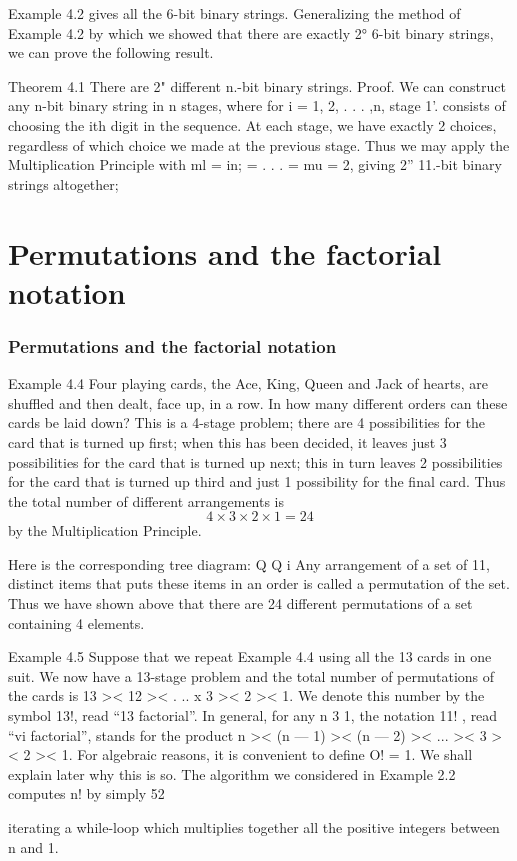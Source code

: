 \documentclass{beamer}
\begin{document}
\begin{frame}
Example 4.2 gives all the 6-bit binary strings. Generalizing the
method of Example 4.2 by which we showed that there are exactly
2° 6-bit binary strings, we can prove the following result.
\end{frame}
\begin{frame}
Theorem 4.1 There are 2" different n.-bit binary strings.
Proof. We can construct any n-bit binary string in n stages, where for
i = 1, 2, . . . ,n, stage 1'. consists of choosing the ith digit in the
sequence. At each stage, we have exactly 2 choices, regardless of
which choice we made at the previous stage. Thus we may apply the
Multiplication Principle with ml = in; = . . . = mu = 2, giving 2”
11.-bit binary strings altogether;
\end{frame}
\section{Permutations and the factorial notation}
\begin{frame}
\frametitle{Permutations and the factorial notation}
Example 4.4 Four playing cards, the Ace, King, Queen and Jack of
hearts, are shuffled and then dealt, face up, in a row. In how many
different orders can these cards be laid down?
\bigskip
This is a 4-stage problem; there are 4 possibilities for the card that is
turned up ﬁrst; when this has been decided, it leaves just 3
possibilities for the card that is turned up next; this in turn leaves 2
possibilities for the card that is turned up third and just 1 possibility
for the ﬁnal card. Thus the total number of different arrangements
is \[4 \times 3 \times 2 \times 1 =24\] by the Multiplication Principle. 
\end{frame}
\begin{frame}
Here is the
corresponding tree diagram:
Q
Q
i
Any arrangement of a set of 11, distinct items that puts these items in
an order is called a permutation of the set. Thus we have shown
above that there are 24 different permutations of a set containing 4
elements.
\end{frame}
\begin{frame}
Example 4.5 Suppose that we repeat Example 4.4 using all the 13
cards in one suit. We now have a 13-stage problem and the total
number of permutations of the cards is 13 >< 12 >< . .. x 3 >< 2 >< 1. We
denote this number by the symbol 13!, read “13 factorial”.
In general, for any n 3 1, the notation 11! , read “vi factorial”, stands
for the product n >< (n — 1) >< (n — 2) >< ... >< 3 >< 2 >< 1. For algebraic
reasons, it is convenient to deﬁne
O! = 1.
We shall explain later why this is so.
The algorithm we considered in Example 2.2 computes n! by simply
52



iterating a while-loop which multiplies together all the positive
integers between n and 1.

\end{frame}
\end{document}
